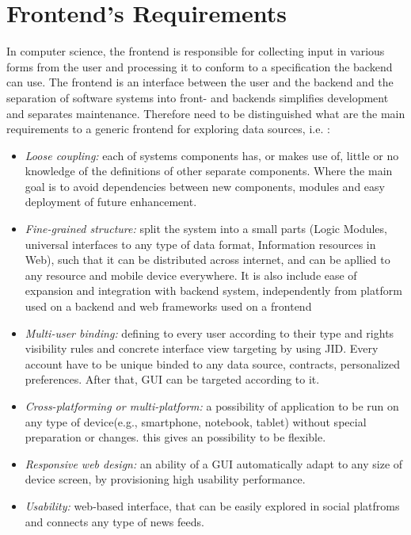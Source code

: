 \section {Frontend's Requirements}
	In computer science, the frontend is responsible for collecting input in various forms from the user and processing it to conform to a specification the backend can use. The frontend is an interface between the user and the backend\cite{wiki:xxx} and the separation of software systems into front- and backends simplifies development and separates maintenance. Therefore need to be distinguished what are the main requirements to a generic frontend for exploring data sources, i.e. :
\begin{itemize}

\item \emph{Loose coupling:} each of systems components has, or makes use of, little or no knowledge of the definitions of other 
       separate components. Where the main goal is to avoid dependencies between new components, modules and easy deployment of future enhancement.
\item \emph{Fine-grained structure:} split the system into a small parts (Logic Modules, universal interfaces to any type of data 
      format, Information resources in Web), such that it can be distributed across internet, and can be apllied to any resource and mobile device everywhere. It is also include ease of expansion and integration with backend system, independently from platform used on a backend and web frameworks used on a frontend
\item \emph{Multi-user binding:} defining to every user according to their type and rights visibility rules and concrete interface view  
       targeting by using JID. Every account have to be unique binded to any data source, contracts, personalized preferences. After that, GUI can be targeted according to it.
\item \emph{Cross-platforming or multi-platform:} a possibility of application to be run on any type of device(e.g., smartphone, 	       notebook, tablet) without special preparation or changes. this gives an possibility to be flexible.
\item \emph{Responsive web design:} an ability of a GUI automatically adapt to any size of device screen, by provisioning high 
      usability performance.
\item \emph{Usability:} web-based interface, that can be easily explored in social platfroms and connects any type of news feeds.
\end{itemize} 

